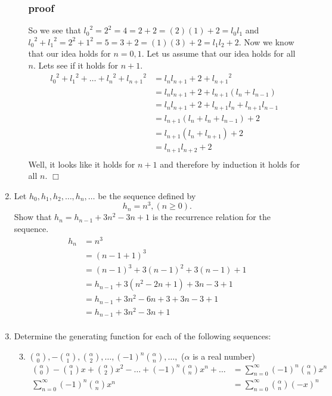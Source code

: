 \documentclass{article}
\begin{document}
\begin{enumerate}
\begin{enumerate}
\subsubsection*{proof}
So we see that ${l_0}^2=2^2=4=2+2=(2)(1)+2=l_0l_1$ and ${l_0}^2+{l_1}^2=2^2+1^2=5=3+2=(1)(3)+2=l_1l_2+2$. Now we know that our idea holds for $n=0,1$. Let us assume that our idea holds for all $n$. Lets see if it holds for $n+1$.
\begin{align*}
  {l_0}^2+{l_1}^2+\dots+{l_n}^2+{l_{n+1}}^2&=l_nl_{n+1}+2+{l_{n+1}}^2\\
  &=l_nl_{n+1}+2+l_{n+1}(l_{n}+l_{n-1})\\
  &=l_nl_{n+1}+2+l_{n+1}l_{n}+l_{n+1}l_{n-1}\\
  &=l_{n+1}(l_n+l_{n}+l_{n-1})+2\\
  &=l_{n+1}(l_n+l_{n+1})+2\\
  &=l_{n+1}l_{n+2}+2\\
\end{align*}
Well, it looks like it holds for $n+1$ and therefore by induction it holds for all $n$. $\Box$
\end{enumerate}
\item
Let $h_0,h_1,h_2,\dots,h_n,\dots$ be the sequence defined by
\[h_n=n^3,(n\ge0).\]
Show that $h_n=h_{n-1}+3n^2-3n+1$ is the recurrence relation for the sequence.
\begin{align*}
  h_n&=n^3\\
  &=(n-1+1)^3\\
  &=(n-1)^3+3(n-1)^2+3(n-1)+1\\
  &=h_{n-1}+3(n^2-2n+1)+3n-3+1\\
  &=h_{n-1}+3n^2-6n+3+3n-3+1\\
  &=h_{n-1}+3n^2-3n+1\\
\end{align*}
\item
Determine the generating function for each of the following sequences:
\begin{enumerate}
\setcounter{enumii}{2}
\item
$\binom{\alpha}{0},-\binom{\alpha}{1},\binom{\alpha}{2},\dots,(-1)^n\binom{\alpha}{n},\dots,$ ($\alpha$ is a real number)
\begin{align*}
  \binom{\alpha}{0}-\binom{\alpha}{1}x+\binom{\alpha}{2}x^2-\dots+(-1)^n\binom{\alpha}{n}x^n+\dots&=\sum\limits_{n=0}^\infty{(-1)^n\binom{\alpha}{n}x^n}\\
  \sum\limits_{n=0}^\infty{(-1)^n\binom{\alpha}{n}x^n}&=\sum\limits_{n=0}^\infty{\binom{\alpha}{n}(-x)^n}\\

\end{align*}
\end{enumerate}
\end{enumerate}
\end{document}
